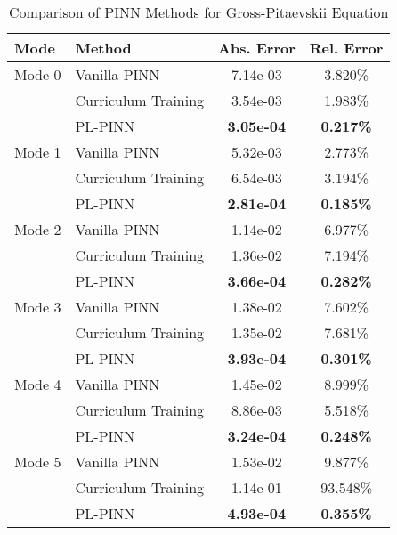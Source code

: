 \begin{table}[htbp]
\centering
\caption{Comparison of PINN Methods for Gross-Pitaevskii Equation}
\label{tab:pinn_comparison}
\begin{tabular}{llcc}
\toprule
Mode & Method & Abs. Error & Rel. Error \\
\midrule
Mode 0 & Vanilla PINN & 7.14e-03 & 3.820\% \\
 & Curriculum Training & 3.54e-03 & 1.983\% \\
 & PL-PINN & \textbf{3.05e-04} & \textbf{0.217\%} \\
\midrule
Mode 1 & Vanilla PINN & 5.32e-03 & 2.773\% \\
 & Curriculum Training & 6.54e-03 & 3.194\% \\
 & PL-PINN & \textbf{2.81e-04} & \textbf{0.185\%} \\
\midrule
Mode 2 & Vanilla PINN & 1.14e-02 & 6.977\% \\
 & Curriculum Training & 1.36e-02 & 7.194\% \\
 & PL-PINN & \textbf{3.66e-04} & \textbf{0.282\%} \\
\midrule
Mode 3 & Vanilla PINN & 1.38e-02 & 7.602\% \\
 & Curriculum Training & 1.35e-02 & 7.681\% \\
 & PL-PINN & \textbf{3.93e-04} & \textbf{0.301\%} \\
\midrule
Mode 4 & Vanilla PINN & 1.45e-02 & 8.999\% \\
 & Curriculum Training & 8.86e-03 & 5.518\% \\
 & PL-PINN & \textbf{3.24e-04} & \textbf{0.248\%} \\
\midrule
Mode 5 & Vanilla PINN & 1.53e-02 & 9.877\% \\
 & Curriculum Training & 1.14e-01 & 93.548\% \\
 & PL-PINN & \textbf{4.93e-04} & \textbf{0.355\%} \\
\bottomrule
\end{tabular}
\end{table}